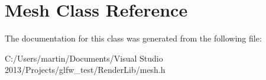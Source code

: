 \hypertarget{class_mesh}{}\section{Mesh Class Reference}
\label{class_mesh}


The documentation for this class was generated from the following file\+:\begin{DoxyCompactItemize}
\item 
C\+:/\+Users/martin/\+Documents/\+Visual Studio 2013/\+Projects/glfw\+\_\+test/\+Render\+Lib/mesh.\+h\end{DoxyCompactItemize}
